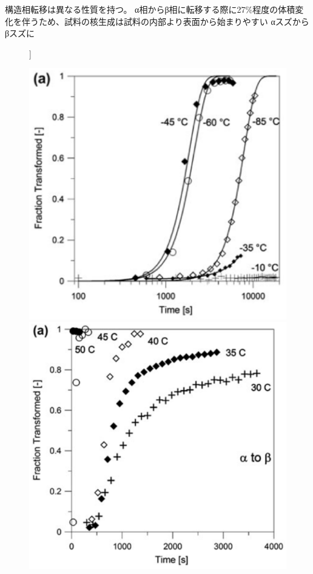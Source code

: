 構造相転移は異なる性質を持つ。
α相からβ相に転移する際に27\%程度の体積変化を伴うため、試料の核生成は試料の内部より表面から始まりやすい\cite{Cornelius}
αスズからβスズに\cite{Nogita}
\begin{figure}[htb]]
 \begin{minipage}{0.5\hsize}
  \begin{center}
   \includegraphics[width=\hsize]{Introduction/beta-to-alpha.eps}
  \end{center}
  \caption{}
  \label{fig:beta-to-alpha}
 \end{minipage}
 \begin{minipage}{0.5\hsize}
  \begin{center}
   \includegraphics[width=\hsize]{Introduction/alpha-to-beta.eps}
  \end{center}
  \caption{}
  \label{fig:alpha-to-beta}
 \end{minipage}
\end{figure}

